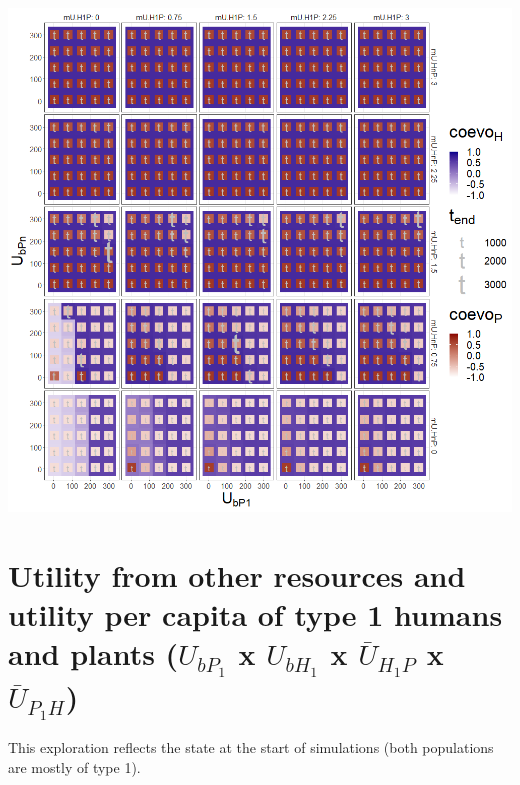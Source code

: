 \documentclass[
]{book}
\begin{document}
\newpage

\includegraphics[width=1\linewidth]{plots/4_fourPar-U.bP-mU.HP_plot}

\newpage

\hypertarget{utility-from-other-resources-and-utility-per-capita-of-type-1-humans-and-plants-u_bp_1-x-u_bh_1-x-baru_h_1p-x-baru_p_1h}{%
\section{\texorpdfstring{Utility from other resources and utility per capita of type 1 humans and plants (\(U_{bP_{1}}\) x \(U_{bH_{1}}\) x \(\bar{U}_{H_{1}P}\) x \(\bar{U}_{P_{1}H}\))}{Utility from other resources and utility per capita of type 1 humans and plants (U\_\{bP\_\{1\}\} x U\_\{bH\_\{1\}\} x \textbackslash bar\{U\}\_\{H\_\{1\}P\} x \textbackslash bar\{U\}\_\{P\_\{1\}H\})}}\label{utility-from-other-resources-and-utility-per-capita-of-type-1-humans-and-plants-u_bp_1-x-u_bh_1-x-baru_h_1p-x-baru_p_1h}}


This exploration reflects the state at the start of simulations (both populations are mostly of type 1).
\end{document}
